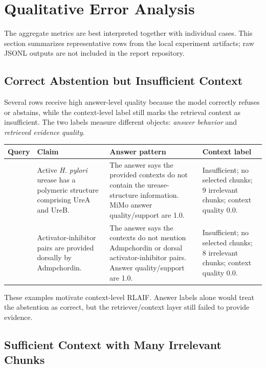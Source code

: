 \section{Qualitative Error Analysis}

The aggregate metrics are best interpreted together with individual cases. This section summarizes representative rows from the local experiment artifacts; raw JSONL outputs are not included in the report repository.

\subsection{Correct Abstention but Insufficient Context}

Several rows receive high answer-level quality because the model correctly refuses or abstains, while the context-level label still marks the retrieval context as insufficient. The two labels measure different objects: \emph{answer behavior} and \emph{retrieved evidence quality}.

\begin{longtable}{>{\raggedright\arraybackslash}p{2.5cm} >{\raggedright\arraybackslash}p{4.6cm} >{\raggedright\arraybackslash}p{4.6cm} >{\raggedright\arraybackslash}p{2.2cm}}
\toprule
Query & Claim & Answer pattern & Context label \\
\midrule
75 & Active \emph{H. pylori} urease has a polymeric structure comprising UreA and UreB. & The answer says the provided contexts do not contain the urease-structure information. MiMo answer quality/support are 1.0. & Insufficient; no selected chunks; 9 irrelevant chunks; context quality 0.0. \\
72 & Activator-inhibitor pairs are provided dorsally by Admpchordin. & The answer says the contexts do not mention Admpchordin or dorsal activator-inhibitor pairs. Answer quality/support are 1.0. & Insufficient; no selected chunks; 8 irrelevant chunks; context quality 0.0. \\
\bottomrule
\end{longtable}

These examples motivate context-level RLAIF. Answer labels alone would treat the abstention as correct, but the retriever/context layer still failed to provide evidence.

\subsection{Sufficient Context with Many Irrelevant Chunks}

